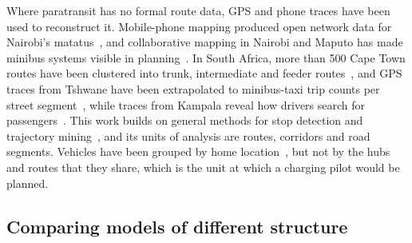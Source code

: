 \documentclass{elsarticle}
\begin{document}
Where paratransit has no formal route data, GPS and phone traces have been used to reconstruct it. Mobile-phone mapping produced open network data for Nairobi's matatus~\cite{williams2015_digital_matatu}, and collaborative mapping in Nairobi and Maputo has made minibus systems visible in planning~\cite{klopp2019_mapping_minibuses}. In South Africa, more than 500 Cape Town routes have been clustered into trunk, intermediate and feeder routes~\cite{dupreez2019_paratransit_route_typology}, and GPS traces from Tshwane have been extrapolated to minibus-taxi trip counts per street segment~\cite{debeer2025_quantifying_paratransit}, while traces from Kampala reveal how drivers search for passengers~\cite{ndibatya2021_characterising_mbt_movement}. This work builds on general methods for stop detection and trajectory mining~\cite{zheng2015_trajectory_data_mining}, and its units of analysis are routes, corridors and road segments. Vehicles have been grouped by home location~\cite{pretorius2024_uneven_transitions}, but not by the hubs and routes that they share, which is the unit at which a charging pilot would be planned.

\subsection{Comparing models of different structure}
\label{sec:rw_comparison}
\end{document}

